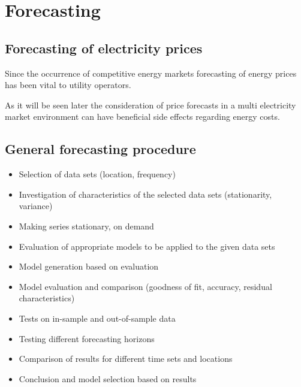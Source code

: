 %
%
%
%
%
%
%




\section{Forecasting}

\subsection{Forecasting of electricity prices}

Since the occurrence of competitive energy markets forecasting of energy prices has been vital to utility operators. 

As it will be seen later the consideration of price forecasts in a multi electricity market environment can have beneficial side effects regarding energy costs. 


\subsection{General forecasting procedure}

\begin{itemize}

\item Selection of data sets (location, frequency)

\item Investigation of characteristics of the selected data sets (stationarity, variance)

\item Making series stationary, on demand

\item Evaluation of appropriate models to be applied to the given data sets

\item Model generation based on evaluation

\item Model evaluation and comparison (goodness of fit, accuracy, residual characteristics) 

\item Tests on in-sample and out-of-sample data

\item Testing different forecasting horizons

\item Comparison of results for different time sets and locations

\item Conclusion and model selection based on results

\end{itemize}


